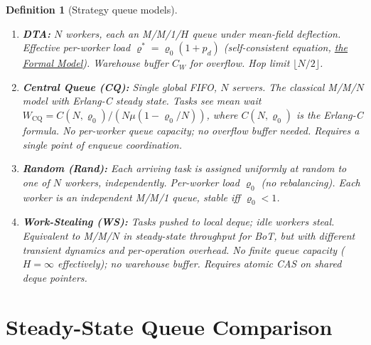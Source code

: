 \documentclass[11pt,a4paper]{article}
\newtheorem{definition}{Definition}[section]
\begin{document}
\begin{definition}[Strategy queue models]~
\begin{enumerate}
  \item \textbf{DTA:}
        $N$ workers, each an M/M/1/$H$ queue under mean-field deflection.
        Effective per-worker load $\varrho^* = \varrho_0(1 + p_d)$
        (self-consistent equation, \hyperref[chap:formal_model]{the Formal Model}).
        Warehouse buffer $C_W$ for overflow.  Hop limit $\lfloor N/2 \rfloor$.

  \item \textbf{Central Queue (CQ):}
        Single global FIFO, $N$ servers.  The classical M/M/$N$ model with
        Erlang-C steady state.  Tasks see mean wait
        $W_{\mathrm{CQ}} = C(N,\varrho_0) / (N\mu(1-\varrho_0/N))$,
        where $C(N,\varrho_0)$ is the Erlang-C formula.
        No per-worker queue capacity; no overflow buffer needed.
        \emph{Requires a single point of enqueue coordination.}

  \item \textbf{Random (Rand):}
        Each arriving task is assigned uniformly at random to one of $N$ workers,
        independently.  Per-worker load $\varrho_0$ (no rebalancing).
        Each worker is an independent M/M/1 queue, stable iff $\varrho_0 < 1$.

  \item \textbf{Work-Stealing (WS):}
        Tasks pushed to local deque; idle workers steal.  Equivalent to
        M/M/$N$ in steady-state throughput for BoT, but with different
        transient dynamics and per-operation overhead.  No finite queue capacity
        ($H = \infty$ effectively); no warehouse buffer.
        \emph{Requires atomic CAS on shared deque pointers.}
\end{enumerate}
\end{definition}

\section{Steady-State Queue Comparison}
\end{document}
